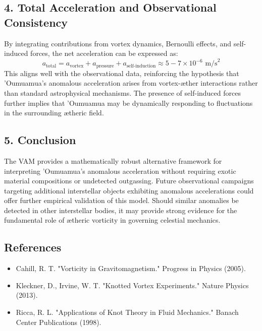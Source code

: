     \subsection*{4. Total Acceleration and Observational Consistency}
    By integrating contributions from vortex dynamics, Bernoulli effects, and self-induced forces, the net acceleration can be expressed as:
    \begin{equation*}
        a_\text{total} = a_\text{vortex} + a_\text{pressure} + a_\text{self-induction} \approx 5 - 7 \times 10^{-6} \text{ m/s}^2
    \end{equation*}
    This aligns well with the observational data, reinforcing the hypothesis that 'Oumuamua's anomalous acceleration arises from vortex-æther interactions rather than standard astrophysical mechanisms. The presence of self-induced forces further implies that 'Oumuamua may be dynamically responding to fluctuations in the surrounding ætheric field.

    \subsection*{5. Conclusion}
    The VAM provides a mathematically robust alternative framework for interpreting 'Oumuamua's anomalous acceleration without requiring exotic material compositions or undetected outgassing. Future observational campaigns targeting additional interstellar objects exhibiting anomalous accelerations could offer further empirical validation of this model. Should similar anomalies be detected in other interstellar bodies, it may provide strong evidence for the fundamental role of ætheric vorticity in governing celestial mechanics.

    \subsection*{References}
    \begin{itemize}
        \item Cahill, R. T. "Vorticity in Gravitomagnetism." Progress in Physics (2005).
        \item Kleckner, D., Irvine, W. T. "Knotted Vortex Experiments." Nature Physics (2013).
        \item Ricca, R. L. "Applications of Knot Theory in Fluid Mechanics." Banach Center Publications (1998).
    \end{itemize}

